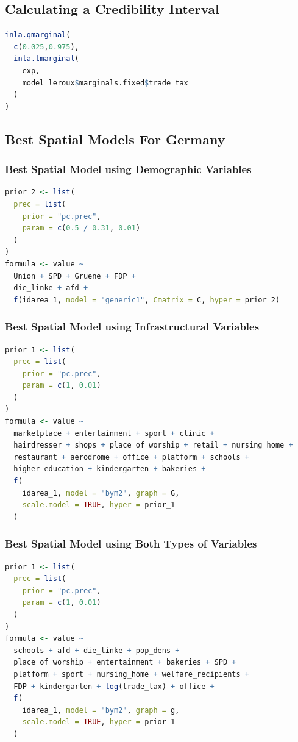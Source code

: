 \subsection{Calculating a Credibility Interval}
\begin{lstlisting}[caption={Extracting the credibility interval for a coefficient}, label={codeCredibility}, language=R]
inla.qmarginal(
  c(0.025,0.975),
  inla.tmarginal(
    exp,
    model_leroux$marginals.fixed$trade_tax
  )
)
\end{lstlisting}
\subsection{Best Spatial Models For Germany}
\subsubsection{Best Spatial Model using Demographic Variables}
\begin{lstlisting}[caption={The code for the demographic models.}, label={codeDemoGermany}, language=R]
prior_2 <- list(
  prec = list(
    prior = "pc.prec",
    param = c(0.5 / 0.31, 0.01)
  )
)
formula <- value ~
  Union + SPD + Gruene + FDP +
  die_linke + afd + 
  f(idarea_1, model = "generic1", Cmatrix = C, hyper = prior_2)
\end{lstlisting}
\subsubsection{Best Spatial Model using Infrastructural Variables}
\begin{lstlisting}[caption={The code for the demographic models.}, label={codeInfraGermany}, language=R]
prior_1 <- list(
  prec = list(
    prior = "pc.prec",
    param = c(1, 0.01)
  )
)
formula <- value ~
  marketplace + entertainment + sport + clinic +
  hairdresser + shops + place_of_worship + retail + nursing_home +
  restaurant + aerodrome + office + platform + schools +
  higher_education + kindergarten + bakeries + 
  f(
    idarea_1, model = "bym2", graph = G,
    scale.model = TRUE, hyper = prior_1
  )
\end{lstlisting}
\subsubsection{Best Spatial Model using Both Types of Variables}
\begin{lstlisting}[caption={The code for the demographic models.}, label={codeBothGermany}, language=R]
prior_1 <- list(
  prec = list(
    prior = "pc.prec",
    param = c(1, 0.01)
  )
)
formula <- value ~
  schools + afd + die_linke + pop_dens +
  place_of_worship + entertainment + bakeries + SPD +
  platform + sport + nursing_home + welfare_recipients +
  FDP + kindergarten + log(trade_tax) + office +
  f(
    idarea_1, model = "bym2", graph = g,
    scale.model = TRUE, hyper = prior_1
  )
\end{lstlisting}
